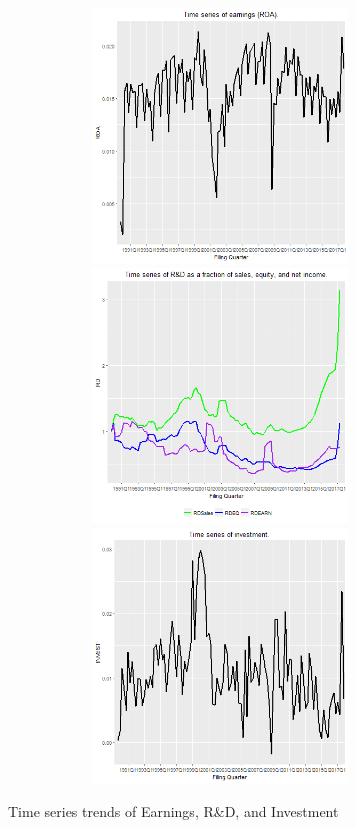 \begin{figure}[H] 
\centering
\includegraphics[width=5in, height=2.66in]{figures/roa-ts}
\includegraphics[width=5in, height=2.66in]{figures/rd-ts}
\includegraphics[width=5in, height=2.66in]{figures/invest-ts}
\captionsetup{justification=centering, width=.95\textwidth} 
\caption{\footnotesize Time series trends of Earnings, R\&D, and Investment} \label{ts-plots}
\end{figure} 
 \newpage 

